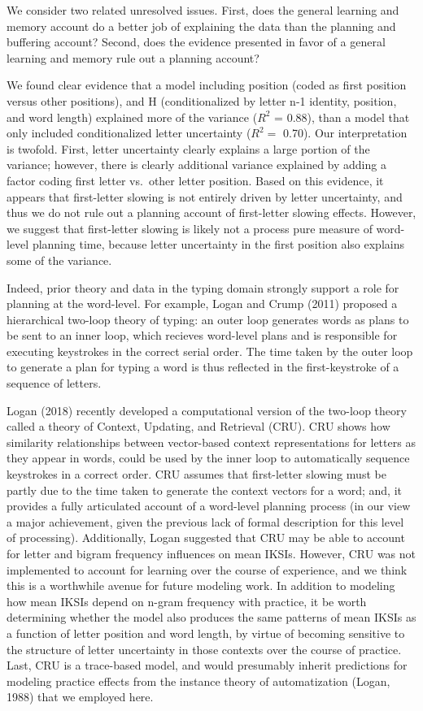 \documentclass[,man,floatsintext]{apa6}
\begin{document}
We consider two related unresolved issues. First, does the general learning and memory account do a better job of explaining the data than the planning and buffering account? Second, does the evidence presented in favor of a general learning and memory rule out a planning account?

We found clear evidence that a model including position (coded as first position versus other positions), and H (conditionalized by letter n-1 identity, position, and word length) explained more of the variance (\(R^2\) = 0.88), than a model that only included conditionalized letter uncertainty (\(R^2 =\) 0.70). Our interpretation is twofold. First, letter uncertainty clearly explains a large portion of the variance; however, there is clearly additional variance explained by adding a factor coding first letter vs.~other letter position. Based on this evidence, it appears that first-letter slowing is not entirely driven by letter uncertainty, and thus we do not rule out a planning account of first-letter slowing effects. However, we suggest that first-letter slowing is likely not a process pure measure of word-level planning time, because letter uncertainty in the first position also explains some of the variance.

Indeed, prior theory and data in the typing domain strongly support a role for planning at the word-level. For example, Logan and Crump (2011) proposed a hierarchical two-loop theory of typing: an outer loop generates words as plans to be sent to an inner loop, which recieves word-level plans and is responsible for executing keystrokes in the correct serial order. The time taken by the outer loop to generate a plan for typing a word is thus reflected in the first-keystroke of a sequence of letters.

Logan (2018) recently developed a computational version of the two-loop theory called a theory of Context, Updating, and Retrieval (CRU). CRU shows how similarity relationships between vector-based context representations for letters as they appear in words, could be used by the inner loop to automatically sequence keystrokes in a correct order. CRU assumes that first-letter slowing must be partly due to the time taken to generate the context vectors for a word; and, it provides a fully articulated account of a word-level planning process (in our view a major achievement, given the previous lack of formal description for this level of processing). Additionally, Logan suggested that CRU may be able to account for letter and bigram frequency influences on mean IKSIs. However, CRU was not implemented to account for learning over the course of experience, and we think this is a worthwhile avenue for future modeling work. In addition to modeling how mean IKSIs depend on n-gram frequency with practice, it be worth determining whether the model also produces the same patterns of mean IKSIs as a function of letter position and word length, by virtue of becoming sensitive to the structure of letter uncertainty in those contexts over the course of practice. Last, CRU is a trace-based model, and would presumably inherit predictions for modeling practice effects from the instance theory of automatization (Logan, 1988) that we employed here.
\end{document}
